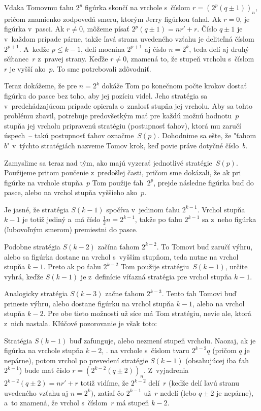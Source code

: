 {Vďaka Tomovmu ťahu $2^p$ figúrka skončí na vrchole s~číslom
$r = (2^p (q \pm 1))_n$, pričom znamienko zodpovedá smeru,
ktorým Jerry figúrkou ťahal. Ak $r = 0$, je figúrka
v~pasci. Ak $r \ne 0$, môžeme písať $2^p (q \pm
1) = nr'+ r$. Číslo $q \pm 1$ je v~každom prípade párne, takže
ľavá strana uvedeného vzťahu je deliteľná číslom $2^{p+1}$.
A~keďže $p \le k-1$, delí mocnina $2^{p+1}$ aj číslo $n = 2^k$,
teda delí aj druhý sčítanec~$r$ z~pravej strany.
Keďže $r \ne0$, znamená to, že stupeň vrcholu s~číslom~$r$ je
vyšší ako~$p$. To sme potrebovali zdôvodniť.

Teraz dokážeme, že pre $n = 2^k$ dokáže Tom po konečnom počte krokov
dostať figúrku do pasce bez toho, aby jej pozíciu videl.
Jeho stratégia sa v~predchádzajúcom prípade opierala
o~znalosť stupňa jej vrcholu. Aby sa tohto problému
zbavil, potrebuje predovšetkým mať pre každú možnú hodnotu~$p$
stupňa jej vrcholu pripravenú stratégiu (postupnosť ťahov), ktorá
mu zaručí úspech~-- takú postupnosť ťahov označme~$S(p)$.
Dohodnime sa ešte, že "ťahom~$b$" v~týchto stratégiách nazveme
Tomov krok, keď povie práve dotyčné číslo~$b$.

Zamyslime sa teraz nad tým, ako majú vyzerať jednotlivé stratégie~$S(p)$.
Použijeme pritom poučenie z~predošlej časti, pričom sme
dokázali, že ak pri figúrke na vrchole stupňa~$p$ Tom použije ťah~$2^p$,
prejde následne figúrka buď do pasce, alebo na vrchol
stupňa vyššieho ako~$p$.

Je jasné, že stratégia $S(k-1)$ spočíva v~jedinom ťahu $2^{k-1}$.
Vrchol stupňa $k-1$ je totiž jediný a~má číslo $\frac12n=2^{k-1}$,
takže po ťahu $2^{k-1}$ sa z~neho figúrka (ľubovoľným smerom) premiestni do pasce.

Podobne stratégia $S(k-2)$ začína ťahom $2^{k-2}$. To Tomovi buď
zaručí výhru, alebo sa figúrka dostane na vrchol s~vyšším
stupňom, teda nutne na vrchol stupňa $k-1$. Preto ak po ťahu
$2^{k-2}$ Tom použije stratégiu~$S(k-1)$, určite vyhrá,
keďže $S(k-1)$ je z~definície víťazná stratégia pre
vrchol stupňa $k-1$.

Analogicky stratégia $S(k-3)$ začne ťahom $2^{k-3}$. Tento ťah
Tomovi buď prinesie výhru, alebo dostane figúrku na vrchol stupňa $k-1$, alebo
na vrchol stupňa $k-2$. Pre obe tieto možnosti už síce má Tom stratégiu,
nevie ale, ktorá z~nich nastala. Kľúčové pozorovanie je však toto:

Stratégia $S(k-1)$ buď zafunguje, alebo nezmení stupeň vrcholu.
Naozaj, ak je figúrka na vrchole stupňa $k-2$, \tj. na vrchole s~číslom
tvaru $2^{k-2} q$ (pričom $q$ je nepárne), potom vrchol po
prevedení stratégie $S(k-1)$ (obsahujúcej iba ťah
$2^{k-1}$) bude mať číslo $r = (2^{k-2} (q \pm 2))_n$. Z~vyjadrenia
$2^{k-2} (q \pm 2) = nr'+ r$ totiž vidíme, že $2^{k-2}$
delí~$r$ (keďže delí ľavú stranu uvedeného vzťahu aj $n = 2^k)$,
zatiaľ čo $2^{k-1}$ už~$r$ nedelí (lebo $q\pm2$ je nepárne),
a~to znamená, že vrchol s~číslom~$r$ má stupeň $k-2$.

}
